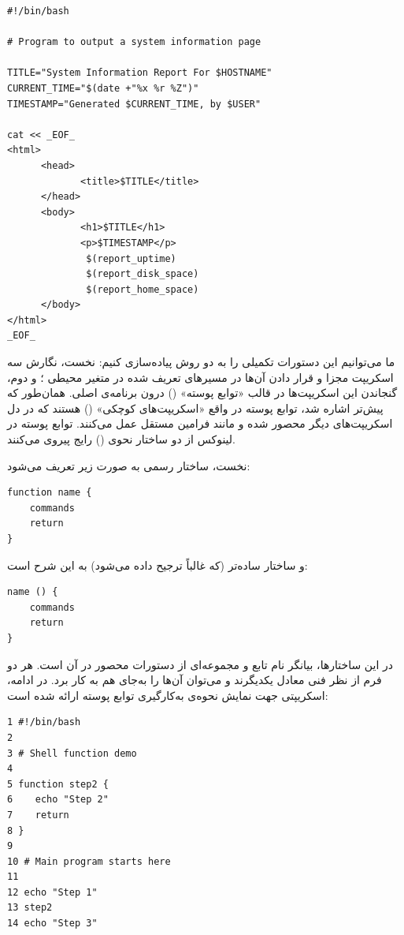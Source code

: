 \begin{latin}
\begin{lstlisting}
#!/bin/bash

# Program to output a system information page

TITLE="System Information Report For $HOSTNAME"
CURRENT_TIME="$(date +"%x %r %Z")"
TIMESTAMP="Generated $CURRENT_TIME, by $USER"

cat << _EOF_
<html>
      <head>
             <title>$TITLE</title>
      </head>
      <body>
             <h1>$TITLE</h1>
             <p>$TIMESTAMP</p>
              $(report_uptime)
              $(report_disk_space)
              $(report_home_space)
      </body>
</html>
_EOF_
\end{lstlisting}
\end{latin}

ما می‌توانیم این دستورات تکمیلی را به دو روش پیاده‌سازی کنیم: نخست، نگارش سه اسکریپت مجزا و قرار دادن آن‌ها در مسیرهای تعریف شده در متغیر محیطی ؛ و دوم، گنجاندن این اسکریپت‌ها در قالب «توابع پوسته» () درون برنامه‌ی اصلی. همان‌طور که پیش‌تر اشاره شد، توابع پوسته در واقع «اسکریپت‌های کوچکی» () هستند که در دل اسکریپت‌های دیگر محصور شده و مانند فرامین مستقل عمل می‌کنند. توابع پوسته در لینوکس از دو ساختار نحوی () رایج پیروی می‌کنند.

نخست، ساختار رسمی به صورت زیر تعریف می‌شود:

\begin{latin}
\begin{lstlisting}
function name {
    commands
    return
}
\end{lstlisting}
\end{latin}

و ساختار ساده‌تر (که غالباً ترجیح داده می‌شود) به این شرح است:

\begin{latin}
\begin{lstlisting}
name () {
    commands
    return
}
\end{lstlisting}
\end{latin}

در این ساختارها،  بیانگر نام تابع و  مجموعه‌ای از دستورات محصور در آن است. هر دو فرم از نظر فنی معادل یکدیگرند و می‌توان آن‌ها را به‌جای هم به کار برد. در ادامه، اسکریپتی جهت نمایش نحوه‌ی به‌کارگیری توابع پوسته ارائه شده است:

\begin{latin}
\begin{lstlisting}
1 #!/bin/bash
2
3 # Shell function demo
4
5 function step2 {
6    echo "Step 2"
7    return
8 }
9
10 # Main program starts here
11
12 echo "Step 1"
13 step2
14 echo "Step 3"
\end{lstlisting}
\end{latin}

